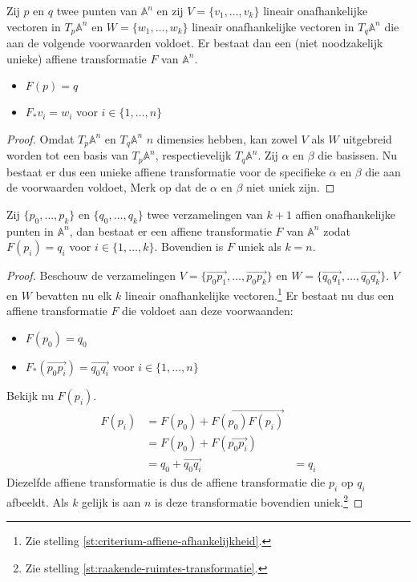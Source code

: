 \documentclass[main.tex]{subfiles}
\begin{document}
\begin{gev}
  Zij $p$ en $q$ twee punten van $\mathbb{A}^{n}$ en zij $V = \{v_{1},\dotsc,v_{k}\}$ lineair onafhankelijke vectoren in $T_{p}\mathbb{A}^{n}$ en $W = \{w_{1},\dotsc,w_{k}\}$ lineair onafhankelijke vectoren in $T_{q}\mathbb{A}^{n}$ die aan de volgende voorwaarden voldoet.
  Er bestaat dan een (niet noodzakelijk unieke) affiene transformatie $F$ van $\mathbb{A}^{n}$.
  \begin{itemize}
  \item $F(p) = q$
  \item $F_{*}v_{i} = w_{i}$ voor $i \in \{ 1,\dotsc,n \}$
  \end{itemize}

  \begin{proof}
    Omdat $T_{p}\mathbb{A}^{n}$ en $T_{q}\mathbb{A}^{n}$ $n$ dimensies hebben, kan zowel $V$ als $W$ uitgebreid worden tot een basis van $T_{p}\mathbb{A}^{n}$, respectievelijk $T_{q}\mathbb{A}^{n}$.
    Zij $\alpha$ en $\beta$ die basissen.
    Nu bestaat er dus een unieke affiene transformatie voor de specifieke $\alpha$ en $\beta$ die aan de voorwaarden voldoet,
    Merk op dat de $\alpha$ en $\beta$ niet uniek zijn.
  \end{proof}
\end{gev}

\begin{gev}
  Zij $\{p_{0},\dotsc,p_{k}\}$ en $\{q_{0},\dotsc,q_{k}\}$ twee verzamelingen van $k+1$ affien onafhankelijke punten in $\mathbb{A}^{n}$, dan bestaat er een affiene transformatie $F$ van $\mathbb{A}^{n}$ zodat $F(p_{i}) = q_{i}$ voor $i \in \{ 1,\dotsc,k \}$. Bovendien is $F$ uniek als $k=n$.

  \begin{proof}
    Beschouw de verzamelingen $V = \{\overrightarrow{p_{0}p_{1}},\dotsc,\overrightarrow{p_{0}p_{k}}\}$ en $W = \{\overrightarrow{q_{0}q_{1}},\dotsc,\overrightarrow{q_{0}q_{k}}\}$.
    $V$ en $W$ bevatten nu elk $k$ lineair onafhankelijke vectoren.\footnote{Zie stelling \ref{st:criterium-affiene-afhankelijkheid}.}
    Er bestaat nu dus een affiene transformatie $F$ die voldoet aan deze voorwaanden:
    \begin{itemize}
    \item $F(p_{0}) = q_{0}$
    \item $F_{*}(\overrightarrow{p_{0}p_{i}}) = \overrightarrow{q_{0}q_{i}}$ voor $i \in \{ 1,\dotsc,n \}$
    \end{itemize}
    Bekijk nu $F(p_{i})$.
    \[
    \begin{array}{rll}
      F(p_{i}) &= F(p_{0}) + \overrightarrow{F(p_{0})F(p_{i})} &\\
               &= F(p_{0}) + F(\overrightarrow{p_{0}p_{i}}) &\\
               &= q_{0} + \overrightarrow{q_{0}q_{i}} &= q_{i}
    \end{array} 
    \]
    Diezelfde affiene transformatie is dus de affiene transformatie die $p_{i}$ op $q_{i}$ afbeeldt.
    Als $k$ gelijk is aan $n$ is deze transformatie bovendien uniek.\footnote{Zie stelling \ref{st:raakende-ruimtes-transformatie}.}
   \end{proof}
\end{gev}
\end{document}
